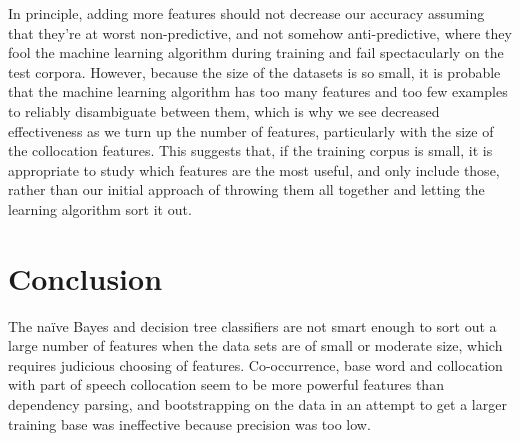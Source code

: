 \documentclass{article}
\newcommand{\naive}{na\"ive}
\begin{document}
In principle, adding more features should not decrease our accuracy assuming
that they're at worst non-predictive, and not somehow anti-predictive, where
they fool the machine learning algorithm during training and fail spectacularly
on the test corpora.  However, because the size of the datasets is so small, it
is probable that the machine learning algorithm has too many features and too
few examples to reliably disambiguate between them, which is why we see
decreased effectiveness as we turn up the number of features, particularly with
the size of the collocation features.  This suggests that, if the training
corpus is small, it is appropriate to study which features are the most useful,
and only include those, rather than our initial approach of throwing them all
together and letting the learning algorithm sort it out.

\section{Conclusion}

The \naive{} Bayes and decision tree classifiers are not smart enough to sort out
a large number of features when the data sets are of small or moderate size,
which requires judicious choosing of features.  Co-occurrence, base word and
collocation with part of speech collocation seem to be more powerful features
than dependency parsing, and bootstrapping on the data in an attempt to get a
larger training base was ineffective because precision was too low.
\end{document}
